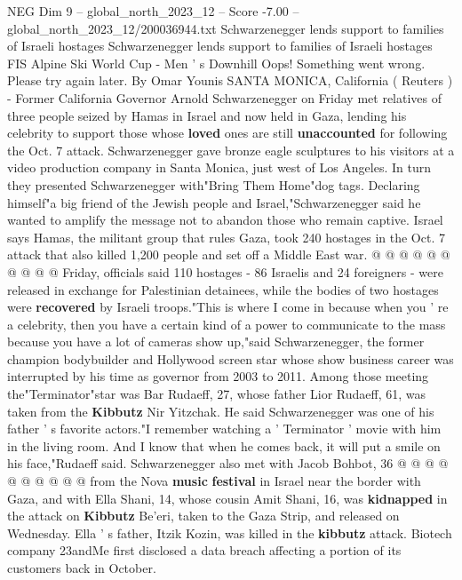 \begin{textsample}{NEG Dim 9 – global\_north\_2023\_12 – Score -7.00 – global\_north\_2023\_12/200036944.txt}  \label{ex:f9_neg_078}
Schwarzenegger lends support to families of Israeli hostages Schwarzenegger lends support to families of Israeli hostages FIS Alpine Ski World Cup - Men ' s Downhill Oops!
Something went wrong.
Please try again later.
By Omar Younis SANTA MONICA, California ( Reuters ) - Former California Governor Arnold Schwarzenegger on Friday met relatives of three people seized by Hamas in Israel and now held in Gaza, lending his celebrity to support those whose \textbf{loved} ones are still \textbf{unaccounted} for following the Oct. 7 attack.
Schwarzenegger gave bronze eagle sculptures to his visitors at a video production company in Santa Monica, just west of Los Angeles.
In turn they presented Schwarzenegger with"Bring Them Home"dog tags.
Declaring himself"a big friend of the Jewish people and Israel,"Schwarzenegger said he wanted to amplify the message not to abandon those who remain captive.
Israel says Hamas, the militant group that rules Gaza, took 240 hostages in the Oct. 7 attack that also killed 1,200 people and set off a Middle East war. @ @ @ @ @ @ @ @ @ @ Friday, officials said 110 hostages - 86 Israelis and 24 foreigners - were released in exchange for Palestinian detainees, while the bodies of two hostages were \textbf{recovered} by Israeli troops."This is where I come in because when you ' re a celebrity, then you have a certain kind of a power to communicate to the mass because you have a lot of cameras show up,"said Schwarzenegger, the former champion bodybuilder and Hollywood screen star whose show business career was interrupted by his time as governor from 2003 to 2011.
Among those meeting the"Terminator"star was Bar Rudaeff, 27, whose father Lior Rudaeff, 61, was taken from the \textbf{Kibbutz} Nir Yitzchak.
He said Schwarzenegger was one of his father ' s favorite actors."I remember watching a ' Terminator ' movie with him in the living room.
And I know that when he comes back, it will put a smile on his face,"Rudaeff said.
Schwarzenegger also met with Jacob Bohbot, 36 @ @ @ @ @ @ @ @ @ @ from the Nova \textbf{music} \textbf{festival} in Israel near the border with Gaza, and with Ella Shani, 14, whose cousin Amit Shani, 16, was \textbf{kidnapped} in the attack on \textbf{Kibbutz} Be'eri, taken to the Gaza Strip, and released on Wednesday.
Ella ' s father, Itzik Kozin, was killed in the \textbf{kibbutz} attack.
Biotech company 23andMe first disclosed a data breach affecting a portion of its customers back in October.

\end{textsample}
